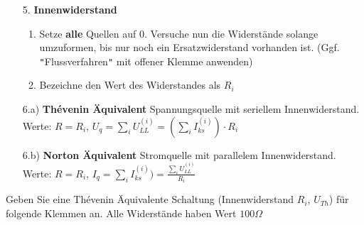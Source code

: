 																				  \iend
																				\begin{itemize}

																				  \item[5.] \textbf{Innenwiderstand}
																				  \begin{enumerate}
																				    \item Setze \textbf{alle} Quellen auf 0. Versuche nun die Widerstände solange umzuformen, bis nur noch ein Ersatzwiderstand vorhanden ist. (Ggf. \texttt{"}Flussverfahren\texttt{"} mit offener Klemme anwenden)
																				    \item Bezeichne den Wert des Widerstandes als $R_i$
																				  \end{enumerate}
																				  \item[6.a)] \textbf{Thévenin Äquivalent} Spannungsquelle mit seriellem Innenwiderstand. \\
																				  Werte: $\displaystyle   R= R_i$, $U_q = \sum_i U_{LL}^{(i)} = (\sum_i I_{ks}^{(i)})\cdot R_i$

																				  \item[6.b)] \textbf{Norton Äquivalent} Stromquelle mit parallelem Innenwiderstand. \\
																				  Werte: $\displaystyle  R= R_i$, $I_q = \sum_i I_{ks}^{(i)}) = \frac{\sum_i U_{LL}^{(i)}}{R_i}$

																				  \end{itemize}

																				\iend





																				\newpage
																				\beginbsp
																				Geben Sie eine Thévenin Äquivalente Schaltung (Innenwiderstand $R_i$, $U_{Th}$) für folgende Klemmen an. Alle Widerstände haben Wert $100\Omega$ \\

